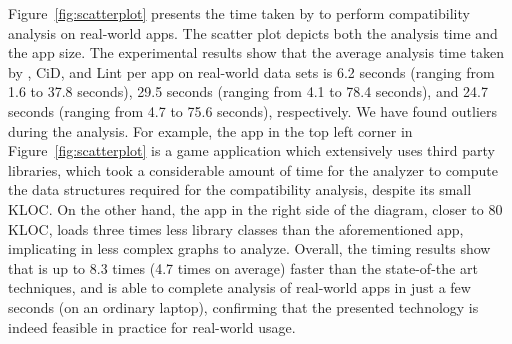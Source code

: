 Figure~\ref{fig:scatterplot} presents the time taken by \@approach 
to perform compatibility analysis on real-world apps.
The scatter plot depicts both the analysis time and the app size.  
The experimental results show that the average 
analysis time taken by \@approach, {\sc CiD}, and {\sc Lint} per app on
real-world data sets is 6.2 seconds (ranging from 1.6
to 37.8 seconds), 29.5 seconds (ranging from 4.1 to
78.4 seconds), and 24.7 seconds (ranging from 4.7 to
75.6 seconds), respectively. We have found outliers during the analysis. For example, the app in the top left corner in Figure~\ref{fig:scatterplot} is a game application which extensively uses third party libraries, which took a considerable amount of time for the analyzer to compute the data structures required for the compatibility analysis, despite its small KLOC. On the other hand, the app in the right side of the diagram, closer to 80 KLOC, loads three times less library classes than the aforementioned app, implicating in less complex graphs to analyze.  
Overall, the timing results show that \@approach  is up to 8.3 times (4.7 times on average) faster than the state-of-the art techniques, and is able to complete analysis of real-world apps in just a few seconds (on an ordinary laptop), confirming that the presented technology is indeed feasible in practice for real-world usage.

